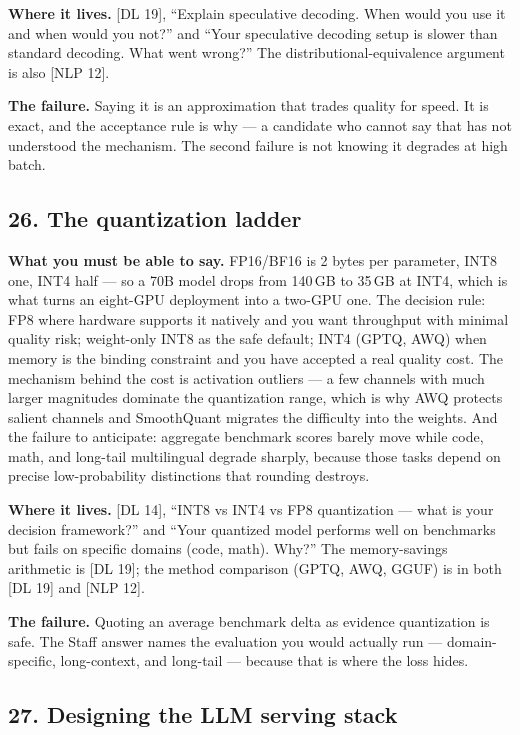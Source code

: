 \textbf{Where it lives.} [DL 19], ``Explain speculative decoding. When would you use it and when would you not?'' and ``Your speculative decoding setup is slower than standard decoding. What went wrong?'' The distributional-equivalence argument is also [NLP 12].

\textbf{The failure.} Saying it is an approximation that trades quality for speed. It is exact, and the acceptance rule is why --- a candidate who cannot say that has not understood the mechanism. The second failure is not knowing it degrades at high batch.

\subsection*{26. The quantization ladder}

\textbf{What you must be able to say.} FP16/BF16 is 2 bytes per parameter, INT8 one, INT4 half --- so a 70B model drops from 140\,GB to 35\,GB at INT4, which is what turns an eight-GPU deployment into a two-GPU one. The decision rule: FP8 where hardware supports it natively and you want throughput with minimal quality risk; weight-only INT8 as the safe default; INT4 (GPTQ, AWQ) when memory is the binding constraint and you have accepted a real quality cost. The mechanism behind the cost is activation outliers --- a few channels with much larger magnitudes dominate the quantization range, which is why AWQ protects salient channels and SmoothQuant migrates the difficulty into the weights. And the failure to anticipate: aggregate benchmark scores barely move while code, math, and long-tail multilingual degrade sharply, because those tasks depend on precise low-probability distinctions that rounding destroys.

\textbf{Where it lives.} [DL 14], ``INT8 vs INT4 vs FP8 quantization --- what is your decision framework?'' and ``Your quantized model performs well on benchmarks but fails on specific domains (code, math). Why?'' The memory-savings arithmetic is [DL 19]; the method comparison (GPTQ, AWQ, GGUF) is in both [DL 19] and [NLP 12].

\textbf{The failure.} Quoting an average benchmark delta as evidence quantization is safe. The Staff answer names the evaluation you would actually run --- domain-specific, long-context, and long-tail --- because that is where the loss hides.

\subsection*{27. Designing the LLM serving stack}

